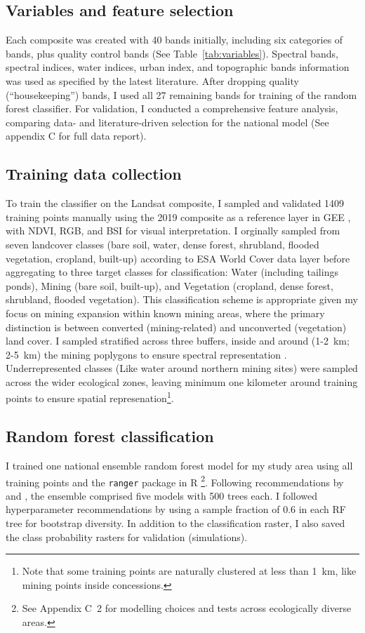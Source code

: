 \documentclass[]{interact}
\begin{document}
\subsection{Variables and feature selection}
Each composite was created with 40 bands initially, including six categories of bands, plus quality control bands (See Table~\ref{tab:variables}). Spectral bands, spectral indices, water indices, urban index, and topographic bands information was used as specified by the latest literature. After dropping quality (``housekeeping'') bands, I used all 27 remaining bands for training of the random forest classifier. For validation, I conducted a comprehensive feature analysis, comparing data- and literature-driven selection for the national model (See appendix C for full data report).

\subsection{Training data collection}
To train the classifier on the Landsat composite, I sampled and validated 1409 training points manually using the 2019 composite as a reference layer in GEE \citep{gorelick2017Google}, with NDVI, RGB, and BSI for visual interpretation. I orginally sampled from seven landcover classes (bare soil, water, dense forest, shrubland, flooded vegetation, cropland, built-up) according to ESA World Cover \citep{zanaga2021ESA} data layer before aggregating to three target classes for classification: Water (including tailings ponds), Mining (bare soil, built-up), and Vegetation (cropland, dense forest, shrubland, flooded vegetation). This classification scheme is appropriate given my focus on mining expansion within known mining areas, where the primary distinction is between converted (mining-related) and unconverted (vegetation) land cover. I sampled stratified across three buffers, inside and around (1-2~km; 2-5~km) the \citet{maus2022update} mining poplygons to ensure spectral representation \citep[p.~388]{duckham2024GIS}. Underrepresented classes (Like water around northern mining sites) were sampled across the wider ecological zones, leaving minimum one kilometer around training points to ensure spatial represenation\footnote{Note that some training points are naturally clustered at less than 1~km, like mining points inside concessions.}.

\subsection{Random forest classification}
I trained one national ensemble random forest model for my study area using all training points and the \texttt{ranger} package in R \citep{wright2017Ranger}\footnote{See Appendix C~2 for modelling choices and tests across ecologically diverse areas.}. Following recommendations by \citet{belgiu2016Random} and \citet{svoboda2022Random}, the ensemble comprised five models with 500 trees each. I followed hyperparameter recommendations by \citet{gislason2006Random} using a sample fraction of 0.6 in each RF tree for bootstrap diversity. In addition to the classification raster, I also saved the class probability rasters for validation (simulations).
\end{document}
